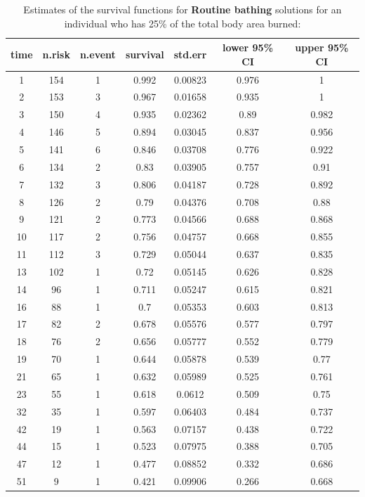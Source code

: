 \documentclass[a4paper, 12pt]{article}
\begin{document}
\begin{table}[!htbp]
\centering
\caption{Estimates of the survival functions for \textbf{Routine bathing} solutions for an individual who has 25\% of the total body area burned:} 
\begin{tabular}{ccccccc}
\hline \hline
time&n.risk&n.event&survival&std.err&lower 95\% CI&upper 95\% CI\\
\hline
1&154&1&0.992&0.00823&0.976&1\\
2&153&3&0.967&0.01658&0.935&1\\
3&150&4&0.935&0.02362&0.89&0.982\\
4&146&5&0.894&0.03045&0.837&0.956\\
5&141&6&0.846&0.03708&0.776&0.922\\
6&134&2&0.83&0.03905&0.757&0.91\\
7&132&3&0.806&0.04187&0.728&0.892\\
8&126&2&0.79&0.04376&0.708&0.88\\
9&121&2&0.773&0.04566&0.688&0.868\\
10&117&2&0.756&0.04757&0.668&0.855\\
11&112&3&0.729&0.05044&0.637&0.835\\
13&102&1&0.72&0.05145&0.626&0.828\\
14&96&1&0.711&0.05247&0.615&0.821\\
16&88&1&0.7&0.05353&0.603&0.813\\
17&82&2&0.678&0.05576&0.577&0.797\\
18&76&2&0.656&0.05777&0.552&0.779\\
19&70&1&0.644&0.05878&0.539&0.77\\
21&65&1&0.632&0.05989&0.525&0.761\\
23&55&1&0.618&0.0612&0.509&0.75\\
32&35&1&0.597&0.06403&0.484&0.737\\
42&19&1&0.563&0.07157&0.438&0.722\\
44&15&1&0.523&0.07975&0.388&0.705\\
47&12&1&0.477&0.08852&0.332&0.686\\
51&9&1&0.421&0.09906&0.266&0.668\\
\hline \hline
\end{tabular}
\end{table}
\end{document}
